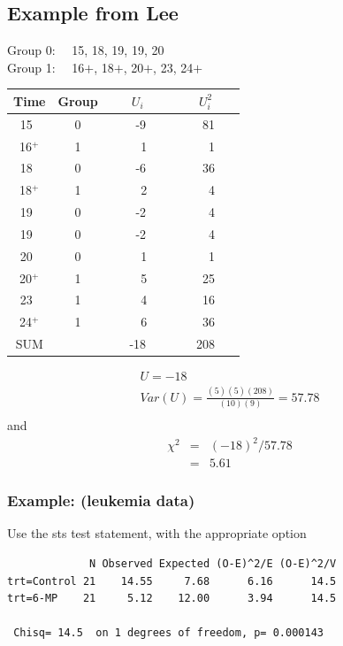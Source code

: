 \documentclass[11pt,slidesonly,semrot,portrait,palatino]{book}
\begin{document}
{\subsection{Example from Lee}
Group 0:~~ 15, 18, 19, 19, 20\\[2ex]
Group 1:~~ 16$+$, 18$+$, 20$+$, 23, 24$+$
\begin{center}
\begin{tabular}{cccc}
\hline \hline
Time & Group & ~~~$U_i$~~~ & ~~~$U_i^2$~~~ \\ \hline
15~    & 0 & ~-9 & ~81 \\
16$^+$ & 1 & ~~1 & ~~1 \\
18~    & 0 & ~-6 & ~36 \\
18$^+$ & 1 & ~~2 & ~~4 \\
19~    & 0 & ~-2 & ~~4 \\
19~    & 0 & ~-2 & ~~4 \\
20~    & 0 & ~~1 & ~~1 \\
20$^+$ & 1 & ~~5 & ~25 \\
23~    & 1 & ~~4 & ~16 \\
24$^+$ & 1 & ~~6 & ~36 \\ \hline
SUM    &   & -18 & 208 \\ \hline \hline
\end{tabular}
\end{center}\small
\begin{eqnarray*}
U = -18 \\[2ex]
Var(U) = \frac{(5)(5)(208)}{(10)(9)} = 57.78\\
\end{eqnarray*}
and
\begin{eqnarray*}
\chi^2 & = & (-18)^2/57.78 \\
       & = & 5.61
\end{eqnarray*}
\subsubsection{Example: (leukemia data)}
Use the sts test statement, with the appropriate option
\begin{verbatim}
             N Observed Expected (O-E)^2/E (O-E)^2/V
trt=Control 21    14.55     7.68      6.16      14.5
trt=6-MP    21     5.12    12.00      3.94      14.5

 Chisq= 14.5  on 1 degrees of freedom, p= 0.000143
\end{verbatim}

}
\end{document}
